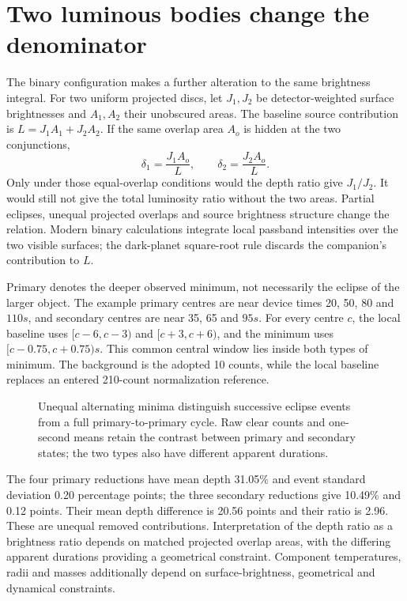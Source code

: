 \section{Two luminous bodies change the denominator}
The binary configuration makes a further alteration to the same brightness integral. For two uniform projected discs, let $J_1,J_2$ be detector-weighted surface brightnesses and $A_1,A_2$ their unobscured areas. The baseline source contribution is $L=J_1A_1+J_2A_2$. If the same overlap area $A_o$ is hidden at the two conjunctions,
\begin{equation}
\delta_1=\frac{J_1A_o}{L},\qquad
\delta_2=\frac{J_2A_o}{L}.
\label{eq:trc-binary}
\end{equation}
Only under those equal-overlap conditions would the depth ratio give $J_1/J_2$. It would still not give the total luminosity ratio without the two areas. Partial eclipses, unequal projected overlaps and source brightness structure change the relation. Modern binary calculations integrate local passband intensities over the two visible surfaces\cite{prsa2016}; the dark-planet square-root rule discards the companion's contribution to $L$.

Primary denotes the deeper observed minimum, not necessarily the eclipse of the larger object. The example primary centres are near device times 20, 50, 80 and $110\unit{s}$, and secondary centres are near 35, 65 and $95\unit{s}$. For every centre $c$, the local baseline uses $[c-6,c-3)$ and $[c+3,c+6)$, and the minimum uses $[c-0.75,c+0.75)\unit{s}$. This common central window lies inside both types of minimum. The background is the adopted 10 counts, while the local baseline replaces an entered 210-count normalization reference.

\begin{figure}[t]
\centering
\caption{Unequal alternating minima distinguish successive eclipse events from a full primary-to-primary cycle. Raw clear counts and one-second means retain the contrast between primary and secondary states; the two types also have different apparent durations.}
\label{fig:trc-binary}
\end{figure}

The four primary reductions have mean depth 31.05\% and event standard deviation 0.20 percentage points; the three secondary reductions give 10.49\% and 0.12 points. Their mean depth difference is 20.56 points and their ratio is 2.96. These are unequal removed contributions. Interpretation of the depth ratio as a brightness ratio depends on matched projected overlap areas, with the differing apparent durations providing a geometrical constraint. Component temperatures, radii and masses additionally depend on surface-brightness, geometrical and dynamical constraints.

